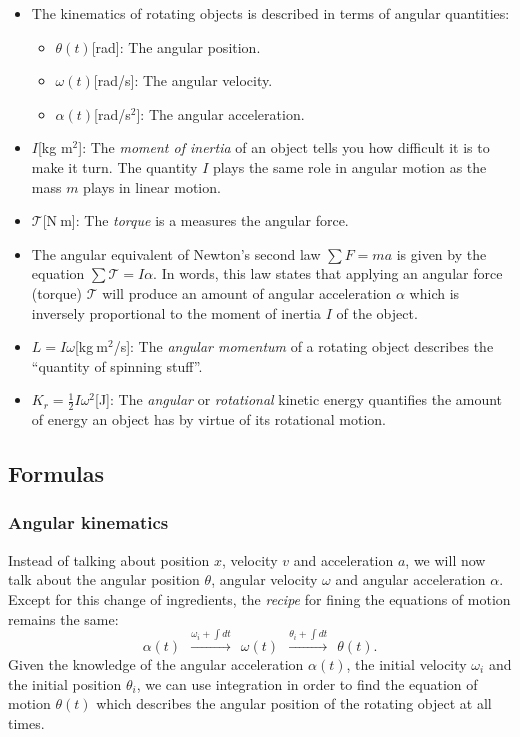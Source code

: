 \documentclass[letterpaper,9pt,journal]{IEEEtran}
\newcommand{\dokuitalic}[1]{\textsl{#1}}
\newcommand{\dokuitem}{\item}
\begin{document}
\begin{itemize}
\dokuitem  The kinematics of rotating objects is described in terms of angular quantities:
\begin{itemize}
\dokuitem  $\theta(t)$[rad]: The angular position.
\dokuitem  $\omega(t)$[rad/s]: The angular velocity. 
\dokuitem  $\alpha(t)$[rad/s$^2$]: The angular acceleration.
\end{itemize}

\dokuitem  $I$[kg m$^2$]: The \dokuitalic{moment of inertia} of an object tells you how difficult it is to make it turn.  The quantity $I$ plays the same role in angular motion as the mass $m$ plays in linear motion.
\dokuitem  $\mathcal{T}$[N$\:$m]: The \dokuitalic{torque} is a measures the angular force.
\dokuitem  The angular equivalent of Newton's second law $\sum F=ma$ is given by the equation $\sum\mathcal{T}=I\alpha$.  In words, this law states that applying an angular force (torque) $\mathcal{T}$ will produce an amount of angular acceleration $\alpha$ which is inversely proportional to the moment of inertia $I$ of the object.
\dokuitem  $L=I\omega$[kg$\:$m$^2$/s]: The \dokuitalic{angular momentum} of a rotating object describes the ``quantity of spinning stuff''.
\dokuitem  $K_r=\frac{1}{2}I\omega^2$[J]: The \dokuitalic{angular} or \dokuitalic{rotational} kinetic energy  quantifies the amount of energy an object has by virtue of its rotational motion.
\end{itemize}

\vspace{-3mm}
\subsection{Formulas}
\label{51d24e1edefe34e683025dbba5c6eed6}%


\subsubsection{Angular kinematics}

Instead of talking about position $x$, velocity $v$ and acceleration $a$,
we will now talk about the angular position $\theta$, angular velocity $\omega$
and angular acceleration $\alpha$.
Except for this change of ingredients, the \dokuitalic{recipe} for fining the 
equations of motion remains the same:
\[
 \alpha(t) 
  \ \ \overset{\omega_i + \int\!dt}{\longrightarrow} 
  \ \ \omega(t) \ \  \overset{\theta_i+ \int\!dt }{\longrightarrow} 
  \ \ \theta(t).
\]
Given the knowledge of the angular acceleration $\alpha(t)$,
the initial velocity $\omega_i$ and the initial position $\theta_i$,
we can use integration in order to find the equation of motion $\theta(t)$
which describes the angular position of the rotating object at all times.
\end{document}
